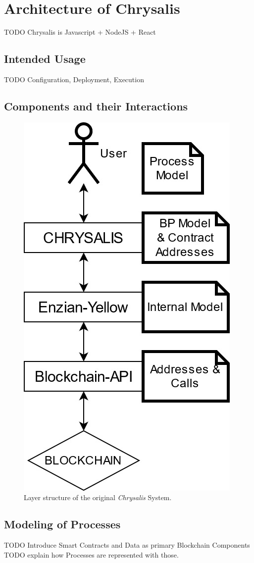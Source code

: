 %
\chapter{Architecture of Chrysalis}
\label{sec:init}

TODO Chrysalis is Javascript + NodeJS + React

\section{Intended Usage}
\label{sec:init:usage}

TODO Configuration, Deployment, Execution

\section{Components and their Interactions}
\label{sec:init:components}


\begin{figure}[h]
	\centering
	\captionsetup{justification=centering,margin=2cm}
	\includegraphics[height=0.5\textwidth]{gfx/init-components-layers}
	\caption{Layer structure of the original \emph{Chrysalis} System.}
	\label{fig:init:components:layers}
\end{figure}

\section{Modeling of Processes}
\label{sec:init:model}

TODO Introduce Smart Contracts and Data as primary Blockchain Components
TODO explain how Processes are represented with those.

